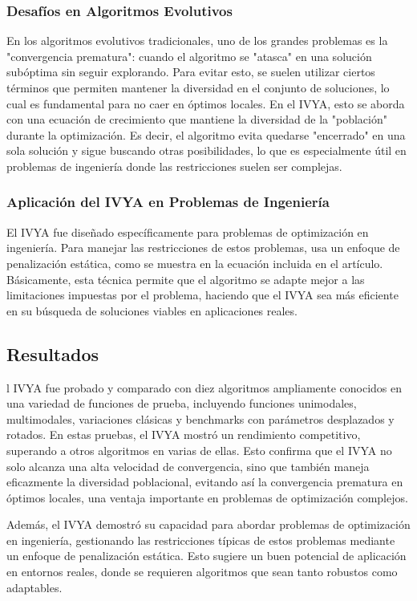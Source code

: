 \subsubsection{Desafíos en Algoritmos Evolutivos}
En los algoritmos evolutivos tradicionales, uno de los grandes problemas es la
"convergencia prematura": cuando el algoritmo se "atasca" en una solución
subóptima sin seguir explorando. Para evitar esto, se suelen utilizar ciertos
términos que permiten mantener la diversidad en el conjunto de soluciones, lo
cual es fundamental para no caer en óptimos locales. En el IVYA, esto se aborda
con una ecuación de crecimiento que mantiene la diversidad de la "población"
durante la optimización. Es decir, el algoritmo evita quedarse "encerrado" en
una sola solución y sigue buscando otras posibilidades, lo que es especialmente
útil en problemas de ingeniería donde las restricciones suelen ser complejas.

\subsubsection{Aplicación del IVYA en Problemas de Ingeniería}
El IVYA fue diseñado específicamente para problemas de optimización en
ingeniería. Para manejar las restricciones de estos problemas, usa un enfoque
de penalización estática, como se muestra en la ecuación incluida en el
artículo. Básicamente, esta técnica permite que el algoritmo se adapte mejor a
las limitaciones impuestas por el problema, haciendo que el IVYA sea más
eficiente en su búsqueda de soluciones viables en aplicaciones reales.

\subsection{Resultados} %
l IVYA fue probado y comparado con diez algoritmos ampliamente conocidos en una
variedad de funciones de prueba, incluyendo funciones unimodales, multimodales,
variaciones clásicas y benchmarks con parámetros desplazados y rotados. En
estas pruebas, el IVYA mostró un rendimiento competitivo, superando a otros
algoritmos en varias de ellas. Esto confirma que el IVYA no solo alcanza una
alta velocidad de convergencia, sino que también maneja eficazmente la
diversidad poblacional, evitando así la convergencia prematura en óptimos
locales, una ventaja importante en problemas de optimización complejos.

Además, el IVYA demostró su capacidad para abordar problemas de optimización en
ingeniería, gestionando las restricciones típicas de estos problemas mediante
un enfoque de penalización estática. Esto sugiere un buen potencial de
aplicación en entornos reales, donde se requieren algoritmos que sean tanto
robustos como adaptables.

